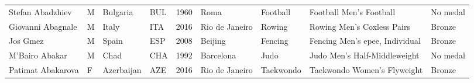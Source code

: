 \documentclass{article}%
\begin{document}
\begin{longtable}{p{1.5cm} p{0.5cm} p{2cm} p{1cm} p{1cm} p{1.5cm} p{1.5cm} p{5cm} p{1.5cm}}
Stefan Abadzhiev&M&Bulgaria&BUL&1960&Roma&Football&Football Men's Football&No medal\\%
Giovanni Abagnale&M&Italy&ITA&2016&Rio de Janeiro&Rowing&Rowing Men's Coxless Pairs&Bronze\\%
Jos Gmez&M&Spain&ESP&2008&Beijing&Fencing&Fencing Men's epee, Individual&Bronze\\%
M'Bairo Abakar&M&Chad&CHA&1992&Barcelona&Judo&Judo Men's Half{-}Middleweight&No medal\\%
Patimat Abakarova&F&Azerbaijan&AZE&2016&Rio de Janeiro&Taekwondo&Taekwondo Women's Flyweight&Bronze\\%
\end{longtable}%
\end{document}
